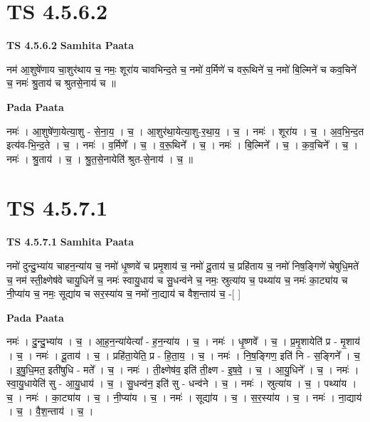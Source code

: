 \documentclass[17pt]{extarticle}
\begin{document}
\section*{ TS 4.5.6.2 }

\textbf{TS 4.5.6.2 } \newline
\textbf{Samhita Paata} \newline

नम॑ आ॒शुषे॑णाय चा॒शुर॑थाय च॒ नमः॒ शूरा॑य चावभिन्द॒ते च॒ नमो॑ व॒र्मिणे॑ च वरू॒थिने॑ च॒ नमो॑ बि॒ल्मिने॑ च कव॒चिने॑ च॒ नमः॑ श्रु॒ताय॑ च श्रुतसे॒नाय॑ च ॥ \newline

\textbf{Pada Paata} \newline

नमः॑ । आ॒शुषे॑णा॒येत्या॒शु - से॒ना॒य॒ । च॒ । आ॒शुर॑था॒येत्या॒शु-र॒था॒य॒ । च॒ । नमः॑ । शूरा॑य । च॒ । अ॒व॒भि॒न्द॒त इत्य॑व-भि॒न्द॒ते । च॒ । नमः॑ । व॒र्मिणे᳚ । च॒ । व॒रू॒थिने᳚ । च॒ । नमः॑ । बि॒ल्मिने᳚ । च॒ । क॒व॒चिने᳚ । च॒ । नमः॑ । श्रु॒ताय॑ । च॒ । श्रु॒त॒से॒नायेति॑ श्रुत-से॒नाय॑ । च॒ ॥  \newline




\section*{ TS 4.5.7.1 }

\textbf{TS 4.5.7.1 } \newline
\textbf{Samhita Paata} \newline

नमो॑ दुन्दु॒भ्या॑य चाहन॒न्या॑य च॒ नमो॑ धृ॒ष्णवे॑ च प्रमृ॒शाय॑ च॒ नमो॑ दू॒ताय॑ च॒ प्रहि॑ताय च॒ नमो॑ निष॒ङ्गिणे॑ चेषुधि॒मते॑ च॒ नम॑ स्ती॒क्ष्णेष॑वे चायु॒धिने॑ च॒ नमः॑ स्वायु॒धाय॑ च सु॒धन्व॑ने च॒ नमः॒ स्रुत्या॑य च॒ पथ्या॑य च॒ नमः॑ का॒ट्या॑य च नी॒प्या॑य च॒ नमः॒ सूद्या॑य च सर॒स्या॑य च॒ नमो॑ ना॒द्याय॑ च वैश॒न्ताय॑ च॒ -[  ] \newline

\textbf{Pada Paata} \newline

नमः॑ । दु॒न्दु॒भ्या॑य । च॒ । आ॒ह॒न॒न्या॑येत्या᳚ - ह॒न॒न्या॑य । च॒ । नमः॑ । धृ॒ष्णवे᳚ । च॒ । प्र॒मृ॒शायेति॑ प्र - मृ॒शाय॑ । च॒ । नमः॑ । दू॒ताय॑ । च॒ । प्रहि॑ता॒येति॒ प्र - हि॒ता॒य॒ । च॒ । नमः॑ । नि॒ष॒ङ्गिण॒ इति॑ नि - स॒ङ्गिने᳚ । च॒ । इ॒षु॒धि॒मत॒ इती॑षुधि - मते᳚ । च॒ । नमः॑ । ती॒क्ष्णेष॑व॒ इति॑ ती॒क्ष्ण - इ॒ष॒वे॒ । च॒ । आ॒यु॒धिने᳚ । च॒ । नमः॑ । स्वा॒यु॒धायेति॑ सु - आ॒यु॒धाय॑ । च॒ । सु॒धन्व॑न॒ इति॑ सु - धन्व॑ने । च॒ । नमः॑ । स्रुत्या॑य । च॒ । पथ्या॑य । च॒ । नमः॑ । का॒ट्या॑य । च॒ । नी॒प्या॑य । च॒ । नमः॑ । सूद्या॑य । च॒ । स॒र॒स्या॑य । च॒ । नमः॑ । ना॒द्याय॑ । च॒ । वै॒श॒न्ताय॑ । च॒ ।  \newline
\end{document}

